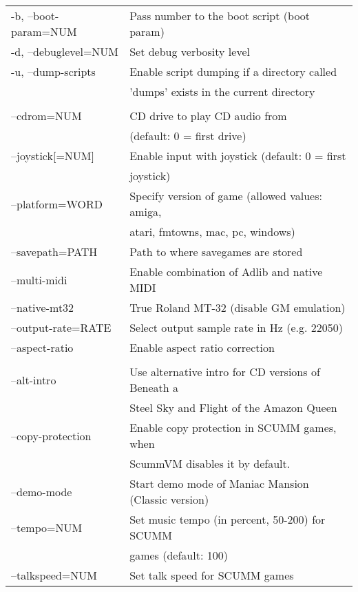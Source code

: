 \begin{tabular}{ll}
  -b, --boot-param=NUM    &Pass number to the boot script (boot param)\\
  -d, --debuglevel=NUM    &Set debug verbosity level\\
  -u, --dump-scripts      &Enable script dumping if a directory called\\
                          &'dumps' exists in the current directory\\
\\
  --cdrom=NUM             &CD drive to play CD audio from\\
                          &(default: 0 = first drive)\\
  --joystick[=NUM]        &Enable input with joystick (default: 0 = first\\
                          &joystick)\\
  --platform=WORD         &Specify version of game (allowed values: amiga,\\
                          &atari, fmtowns, mac, pc, windows)\\
  --savepath=PATH         &Path to where savegames are stored\\
  --multi-midi            &Enable combination of Adlib and native MIDI\\
  --native-mt32           &True Roland MT-32 (disable GM emulation)\\
  --output-rate=RATE      &Select output sample rate in Hz (e.g. 22050)\\
  --aspect-ratio          &Enable aspect ratio correction\\
\\
  --alt-intro             &Use alternative intro for CD versions of Beneath a\\
                          &Steel Sky and Flight of the Amazon Queen\\
  --copy-protection       &Enable copy protection in SCUMM games, when\\
                          &ScummVM disables it by default.\\
  --demo-mode             &Start demo mode of Maniac Mansion (Classic version)\\
  --tempo=NUM             &Set music tempo (in percent, 50-200) for SCUMM\\
                          &games (default: 100)\\
  --talkspeed=NUM         &Set talk speed for SCUMM games\\
\end{tabular}

